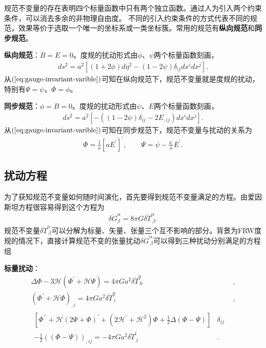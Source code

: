 \documentclass{article}
\begin{document}
  规范不变量的存在表明四个标量函数中只有两个独立函数。通过人为引入两个约束条件，可以消去多余的非物理自由度。
  不同的引入约束条件的方式代表不同的规范，效果等价于选取一个唯一的坐标系或一类坐标簇。常用的规范有\textbf{纵向规范}和\textbf{同步规范}。

  \textbf{纵向规范}：$B=E=0$。度规的扰动形式由$\phi$、$\psi$两个标量函数刻画，
  \begin{align}
    \label{eq:conformal-newtonian}
    ds^2=a^2{\left[(1+2\phi)d\eta^2-(1-2\psi)\delta_{ij}dx^{i}dx^{j}\right]}.
  \end{align}
  从$(\ref{eq:gauge-invariant-varible})$可知在纵向规范下，规范不变量就是度规的扰动，特别有$\Psi=\psi
  $，$\Phi=\phi$。

  \textbf{同步规范}：$\phi=B=0$。度规的扰动形式由$\psi$、$E$两个标量函数刻画，
  \begin{align}
    \label{eq:syncronous-gauge}
    ds^2=a^2{\left[-{\left((1-2\psi)\delta_{ij}-2E_{,ij}\right)}dx^{i}dx^{j}\right]}.
  \end{align}
  从$(\ref{eq:gauge-invariant-varible})$可知在同步规范下，规范不变量与扰动的关系为
  \begin{align}
    \Phi=\frac{1}{a}{\left[aE^\prime\right]}^{\prime},\qquad
    \Psi=\psi-\frac{a^\prime}{a}E^\prime.
  \end{align}
  
  \subsection{扰动方程}
  为了获知规范不变量如何随时间演化，首先要得到规范不变量满足的方程。由爱因斯坦方程很容易得到这个方程为
  \begin{align}
    \label{eq:gauge-invariant-perturbation-equation}
    \overline{\delta G}^{\alpha}_{\beta}= 8\pi G\overline{\delta
    T}^{\alpha}_{\ \beta}. 
  \end{align}
  规范不变量$\overline{\delta T}^{\alpha}_{\
  \beta}$可以分解为标量、矢量、张量三个互不影响的部分。背景为FRW度规的情况下，直接计算规范不变的张量扰动$\overline{\delta
G}^{\alpha}_{\ \beta}$可以得到三种扰动分别满足的方程组
  
  \textbf{标量扰动}：
  \begin{align}
    \Delta\Phi-3\mathcal{H}{\left(\Phi^\prime+\mathcal{H}\Psi\right)} =
    4\pi Ga^2\overline{\delta T}^{0}_{\ 0}&, 
    \label{eq:equation-gauge-scalar-perturbation1}\\
    {\left(\Phi^\prime+\mathcal{H}\Phi\right)}_{,i}=4\pi
    Ga^2\overline{\delta T}^{0}_{\ i}&,
    \label{eq:equation-gauge-scalar-perturbation2}\\
    \begin{split}
      {\left[\Phi^{\prime\prime}+\mathcal{H}{\left(2\Psi+\Phi\right)}^{\prime}+(2\mathcal{H^\prime}+\mathcal{H}^2)\Phi 
  +\frac{1}{2}\Delta(\Phi-\Psi)\right]}&\delta_{ij} \\
      -\frac{1}{2}{\left((\Phi-\Psi)\right)}_{,ij} = -4\pi
  Ga^2\overline{\delta T}^{i}_{\ j}&.
    \end{split}
    \label{eq:equation-gauge-scalar-perturbation3}
  \end{align}
  
\end{document}

